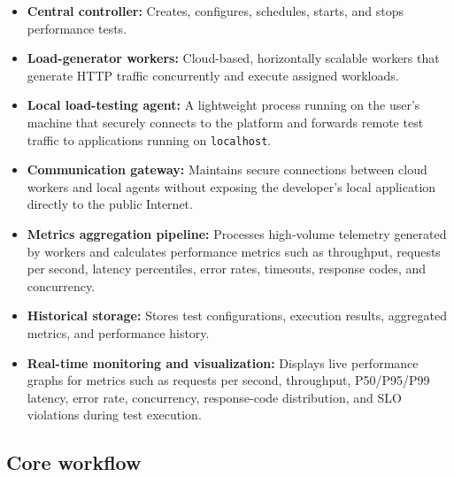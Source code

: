 \documentclass[11pt,a4paper]{article}
\begin{document}
\begin{itemize}[leftmargin=0.7cm]

    \item \textbf{Central controller:} Creates, configures, schedules,
    starts, and stops performance tests.

    \item \textbf{Load-generator workers:} Cloud-based, horizontally
    scalable workers that generate HTTP traffic concurrently and
    execute assigned workloads.

    \item \textbf{Local load-testing agent:} A lightweight process
    running on the user's machine that securely connects to the
    platform and forwards remote test traffic to applications running
    on \texttt{localhost}.

    \item \textbf{Communication gateway:} Maintains secure connections
    between cloud workers and local agents without exposing the
    developer's local application directly to the public Internet.

    \item \textbf{Metrics aggregation pipeline:} Processes high-volume
    telemetry generated by workers and calculates performance metrics
    such as throughput, requests per second, latency percentiles,
    error rates, timeouts, response codes, and concurrency.

    \item \textbf{Historical storage:} Stores test configurations,
    execution results, aggregated metrics, and performance history.

    \item \textbf{Real-time monitoring and visualization:} Displays
    live performance graphs for metrics such as requests per second,
    throughput, P50/P95/P99 latency, error rate, concurrency,
    response-code distribution, and SLO violations during test
    execution.

\end{itemize}

\subsection{Core workflow}
\end{document}
